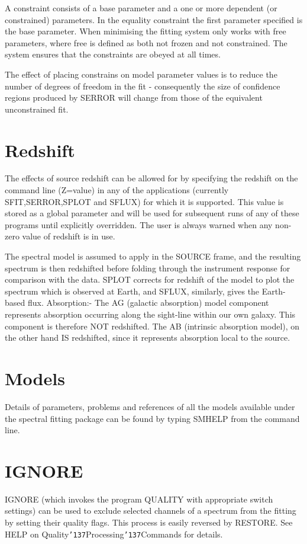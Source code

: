 \documentclass{book}
\renewcommand{\_}{{\tt\char'137}}     %
\begin{document}
A constraint consists of a base parameter and a one or more dependent
(or constrained) parameters. In the equality constraint the first
parameter specified is the base parameter. When minimising the fitting
system only works with free parameters, where free is defined as both
not frozen and not constrained. The system ensures that the constraints
are obeyed at all times.

The effect of placing constrains on model parameter values is to
reduce the number of degrees of freedom in the fit - consequently the
size of confidence regions produced by SERROR will change from those
of the equivalent unconstrained fit.

\section{Redshift}
The effects of source redshift can be allowed for by specifying
the redshift on the command line (Z=value) in any of the
applications (currently SFIT,SERROR,SPLOT and SFLUX) for which it
is supported. This value is stored as a global parameter and will
be used for subsequent runs of any of these programs until
explicitly overridden. The user is always warned when any non-zero
value of redshift is in use.

The spectral model is assumed to apply in the SOURCE frame, and
the resulting spectrum is then redshifted before folding through
the instrument response for comparison with the data. SPLOT
corrects for redshift of the model to plot the spectrum which is
observed at Earth, and SFLUX, similarly, gives the Earth-based
flux.
Absorption:-
The AG (galactic absorption) model component represents absorption
occurring along the sight-line within our own galaxy. This component
is therefore NOT redshifted. The AB (intrinsic absorption model), on
the other hand IS redshifted, since it represents absorption local
to the source.
\section{Models}
Details of parameters, problems and references of all the models
available under the spectral fitting package can be found by typing
SMHELP from the command line.
\section{IGNORE}
IGNORE (which invokes the program QUALITY with appropriate switch
settings) can be used to exclude selected channels of a spectrum
from the fitting by setting their quality flags. This process is
easily reversed by RESTORE.
See HELP on Quality\_Processing\_Commands for details.
\end{document}
